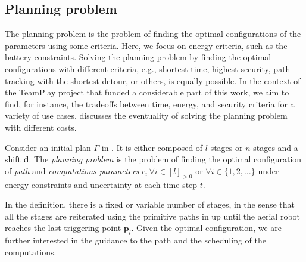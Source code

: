 \subsection{Planning problem}
\label{sec:plan-pb}

The planning problem is the problem of finding the optimal configurations of the parameters using some criteria. 
Here, we focus on energy criteria, such as the battery constraints. %
Solving the planning problem by finding the optimal configurations with different criteria, e.g., shortest time, highest security, path tracking with the shortest detour, or others, is equally possible. In the context of the TeamPlay project that funded a considerable part of this work, we aim to find, for instance, the tradeoffs between time, energy, and security criteria for a variety of use cases.  discusses the eventuality of solving the planning problem with different costs. 

\begin{pb}
  \label{pb}
  Consider an initial plan $\Gamma$ in . It is either composed of $l$ stages or $n$ stages and a shift $\mathbf{d}$. The \emph{planning problem} is the problem of finding the optimal configuration of \emph{path} and \emph{computations parameters} $c_i\,\forall i\in[l]_{>0}$ or $\forall i\in\{1,2,\dots\}$ under energy constraints and uncertainty at each time step $t$.
\end{pb}    

In the definition, there is a fixed or variable number of stages, in the sense that all the stages are reiterated using the primitive paths in  up until the aerial robot reaches the last triggering point $\mathbf{p}_l$. Given the optimal configuration, we are further interested in the guidance to the path and the scheduling of the computations.

